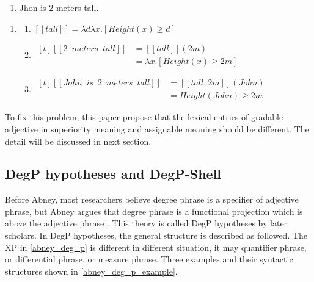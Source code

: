 \documentclass{ctexart}
\let \cite \parencite
\begin{document}
\begin{enumerate}[resume]
    \item \label{john_gao_2_mi} Jhon is 2 meters tall.
\end{enumerate}

\begin{enumerate}[resume]
    \item \label{john_gao_2_mi_LE}
    
    \begin{enumerate}[ref=(\arabic{enumi}\alph*)]
    \item \label{john_gao_2_mi_LE_a} 
    $[\![tall]\!] = \lambda d \lambda x.[Height(x) \geq d]$
    
    \item \label{john_gao_2_mi_LE_b} 
    $\begin{aligned}[t]
        [\![2 \enspace meters \enspace tall]\!] &= [\![tall]\!](2m) \\
        &= \lambda x.[Height(x) \geq 2m]
    \end{aligned}$
    
    \item \label{john_gao_2_mi_LE_c} 
    $\begin{aligned}[t]
        [\![John \enspace is \enspace 2 \enspace meters \enspace tall]\!] &= [\![tall \enspace 2m]\!](John) \\
        &= Height(John) \geq 2m
    \end{aligned}$
    
    \end{enumerate}
\end{enumerate}

To fix this problem, this paper propose that the lexical entries of gradable adjective in superiority meaning and assignable meaning should be different. The detail will be discussed in next section.

\subsection{DegP hypotheses and DegP-Shell}

Before Abney, most researchers believe degree phrase is a specifier of adjective phrase, but Abney argues that degree phrase is a functional projection which is above the adjective phrase \cite{abney1987}. This theory is called DegP hypotheses by later scholars. In DegP hypotheses, the general structure is described as followed. The XP in \ref{abney_deg_p} is different in different situation, it may quantifier phrase, or differential phrase, or measure phrase. Three examples and their syntactic structures shown in \ref{abney_deg_p_example}.
\end{document}
